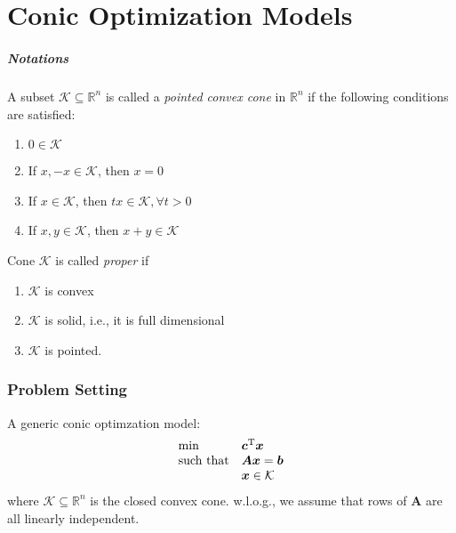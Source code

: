 \chapter{Conic Optimization Models}
\paragraph{Notations}
\begin{definition}
A subset $\mathcal{K}\subseteq\mathbb{R}^n$ is called a \emph{pointed convex cone} in $\mathbb{R}^n$ if the following conditions are satisfied:
\begin{enumerate}
\item
$0\in\mathcal{K}$
\item
If $x,-x\in\mathcal{K}$, then $x=0$
\item
If $x\in\mathcal{K}$, then $tx\in\mathcal{K},\forall t>0$
\item
If $x,y\in\mathcal{K}$, then $x+y\in\mathcal{K}$
\end{enumerate}
\end{definition}
\begin{definition}[Proper]
Cone $\mathcal{K}$ is called \emph{proper} if
\begin{enumerate}
\item
$\mathcal{K}$ is convex
\item
$\mathcal{K}$ is solid, i.e., it is full dimensional
\item
$\mathcal{K}$ is pointed.
\end{enumerate}
\end{definition}
\subsection{Problem Setting}
A generic conic optimzation model:
\[
\begin{array}{ll}
\min&\bm c^{\mathrm T}\bm x\\
\mbox{such that}&\bm{Ax}=\bm b\\
&\bm x\in\mathcal{K}
\end{array}
\]
where $\mathcal{K}\subseteq\mathbb{R}^n$ is the closed convex cone.
w.l.o.g., we assume that rows of $\bm A$ are all linearly independent.

